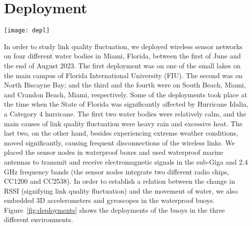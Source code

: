 \section{Deployment}
\label{sec:deployment}

\begin{figure*}
	\centering
	\texttt{[image: depl]}
	\caption{The deployment of waterproof buoys on the surface of different water bodies. From left to right: A prototype low-power IoT node; deployments on: a lake on FIU's Modesto A. Maidique Campus, Miami South Beach, and Crandon Beach.}
	\label{fig:deployments}
\end{figure*}

In order to study link quality fluctuation, we deployed wireless sensor networks on four different water bodies in Miami, Florida, between the first of June and the end of August 2023. The first deployment was on one of the small lakes on the main campus of Florida International University (FIU). The second was on North Biscayne Bay; and the third and the fourth were on South Beach, Miami, and Crandon Beach, Miami, respectively. Some of the deployments took place at the time when the State of Florida was significantly affected by Hurricane Idalia, a  Category 4 hurricane. The first two water bodies were relatively calm, and the main causes of link quality fluctuation were heavy rain and excessive heat. The last two, on the other hand, besides experiencing extreme weather conditions, moved significantly, causing frequent disconnections of the wireless links. We placed the sensor nodes in waterproof boxes and used waterproof marine antennas to transmit and receive electromagnetic signals in the sub-Giga and 2.4 GHz frequency bands (the sensor nodes integrate two different radio chips, CC1200 and CC2538). In order to establish a relation between the change in RSSI (signifying link quality fluctuation) and the movement of water, we also embedded 3D accelerometers and gyroscopes in the waterproof buoys. Figure~\ref{fig:deployments} shows the deployments of the buoys in the three different environments. 


